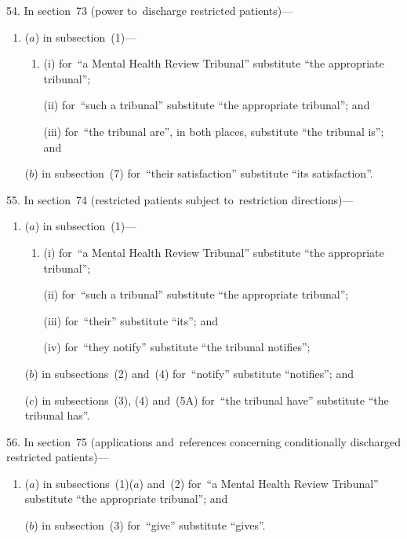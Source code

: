 \documentclass[12pt,a4paper]{article}
\begin{document}
\medskip

54.  In section~73 (power to~discharge restricted patients)—
\begin{enumerate}\item[]
($a$) in subsection~(1)—
\begin{enumerate}\item[]
(i) for~“a Mental Health Review Tribunal” substitute “the appropriate tribunal”;

(ii) for~“such a tribunal” substitute “the appropriate tribunal”; and

(iii) for~“the tribunal are”, in both places, substitute “the tribunal is”; and
\end{enumerate}

($b$) in subsection~(7) for~“their satisfaction” substitute “its satisfaction”.
\end{enumerate}

\medskip

55.  In section~74 (restricted patients subject to~restriction directions)—
\begin{enumerate}\item[]
($a$) in subsection~(1)—
\begin{enumerate}\item[]
(i) for~“a Mental Health Review Tribunal” substitute “the appropriate tribunal”;

(ii) for~“such a tribunal” substitute “the appropriate tribunal”;

(iii) for~“their” substitute “its”; and

(iv)  for~“they notify” substitute “the tribunal notifies”;
\end{enumerate}

($b$) in subsections~(2) and~(4) for~“notify” substitute “notifies”; and

($c$) in subsections~(3), (4) and~(5A) for~“the tribunal have” substitute “the tribunal has”.
\end{enumerate}

\medskip

56.  In section~75 (applications and~references concerning conditionally discharged restricted patients)—
\begin{enumerate}\item[]
($a$) in subsections~(1)($a$)  and~(2) for~“a Mental Health Review Tribunal” substitute “the appropriate tribunal”; and

($b$) in subsection~(3) for~“give” substitute “gives”.
\end{enumerate}
\end{document}
